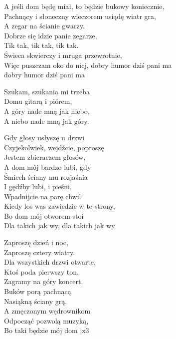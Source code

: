
\begin{text}
    A jeśli dom będę miał, to będzie bukowy koniecznie,\\
    Pachnący i słoneczny wieczorem usiądę wiatr gra,\\
    A zegar na ścianie gwarzy.\\
    Dobrze się idzie panie zegarze,\\
    Tik tak, tik tak, tik tak.\\
    Świeca skwierczy i mruga przewrotnie,\\
    Więc puszczam oko do niej, dobry humor dziś pani ma\\
    dobry humor dziś pani ma

    \vin Szukam, szukania mi trzeba\\
    \vin Domu gitarą i piórem,\\
    \vin A góry nade mną jak niebo,\\
    \vin A niebo nade mną jak góry.

    Gdy głosy usłyszę u drzwi\\
    Czyjekolwiek, wejdźcie, poproszę\\
    Jestem zbieraczem głosów,\\
    A dom mój bardzo lubi, gdy\\
    Śmiech ściany mu rozjaśnia\\
    I gędźby lubi, i pieśni,\\
    Wpadnijcie na parę chwil\\
    Kiedy los was zawiedzie w te strony,\\
    Bo dom mój otworem stoi\\
    Dla takich jak wy, dla takich jak wy

    Zaproszę dzień i noc,\\
    Zaproszę cztery wiatry.\\
    Dla wszystkich drzwi otwarte,\\
    Ktoś poda pierwszy ton,\\
    Zagramy na góry koncert.\\
    Buków porą pachnącą\\
    Nasiąkną ściany grą,\\
    A zmęczonym wędrownikom\\
    Odpocząć pozwolą muzyką,\\
    Bo taki będzie mój dom |x3
\end{text}
\begin{chord}

\end{chord}